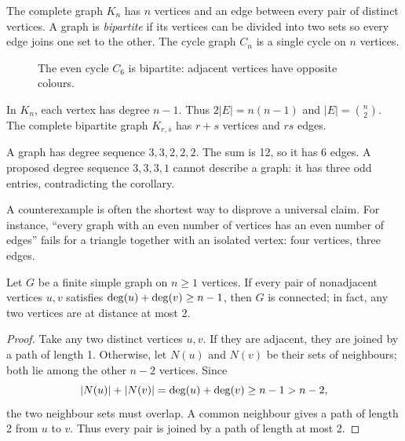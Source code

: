 \begin{definition}
The complete graph $K_n$ has $n$ vertices and an edge between every pair of distinct vertices. A graph is \emph{bipartite} if its vertices can be divided into two sets so every edge joins one set to the other. The cycle graph $C_n$ is a single cycle on $n$ vertices.
\end{definition}

\begin{figure}[htbp]
\centering
{}
\caption{The even cycle $C_6$ is bipartite: adjacent vertices have opposite colours.}
\end{figure}

In $K_n$, each vertex has degree $n-1$. Thus $2|E|=n(n-1)$ and $|E|=\binom n2$. The complete bipartite graph $K_{r,s}$ has $r+s$ vertices and $rs$ edges.

\begin{example}
A graph has degree sequence $3,3,2,2,2$. The sum is 12, so it has 6 edges. A proposed degree sequence $3,3,3,1$ cannot describe a graph: it has three odd entries, contradicting the corollary.
\end{example}

A counterexample is often the shortest way to disprove a universal claim. For instance, ``every graph with an even number of vertices has an even number of edges'' fails for a triangle together with an isolated vertex: four vertices, three edges.

\begin{theorem}
Let $G$ be a finite simple graph on $n\geq 1$ vertices. If every pair of nonadjacent vertices $u,v$ satisfies $\operatorname{deg}(u)+\operatorname{deg}(v)\geq n-1$, then $G$ is connected; in fact, any two vertices are at distance at most 2.
\end{theorem}
\begin{proof}
Take any two distinct vertices $u,v$. If they are adjacent, they are joined by a path of length 1. Otherwise, let $N(u)$ and $N(v)$ be their sets of neighbours; both lie among the other $n-2$ vertices. Since
\[
|N(u)|+|N(v)|=\operatorname{deg}(u)+\operatorname{deg}(v)\geq n-1>n-2,
\]
the two neighbour sets must overlap. A common neighbour gives a path of length 2 from $u$ to $v$. Thus every pair is joined by a path of length at most 2.
\end{proof}

